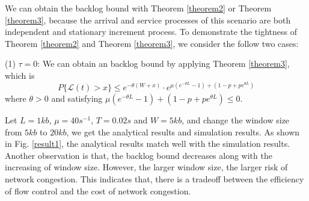 \documentclass[paper]{ieice}
\begin{document}

We can obtain the backlog bound with Theorem \ref{theorem2} or Theorem \ref{theorem3}, because the arrival and service processes of this scenario are both independent and stationary increment process. To demonstrate the tightness of Theorem \ref{theorem2} and Theorem \ref{theorem3}, we consider the follow two cases:

(1) $\tau=0$: We can obtain an backlog bound by applying Theorem \ref{theorem3}, which is
\begin{equation*}\label{equation3}
P\{\mathcal{L}(t)>x\}\leq e^{-\theta(W+x)}\cdot e^{\mu(e^{-\theta L}-1)+(1-p+pe^{\theta L})}
\end{equation*}
where $\theta>0$ and satisfying $\mu(e^{-\theta L}-1)+(1-p+pe^{\theta L})\leq 0$.

Let $L=1kb$, $\mu=40s^{-1}$, $T=0.02s$ and $W=5kb$, and change the window size from $5kb$ to $20kb$, we get the analytical results and simulation results. As shown in Fig. \ref{result1}, the analytical results match well with the simulation results. Another observation is that, the backlog bound decreases along with the increasing of window size. However, the larger window size, the larger risk of network congestion. This indicates that, there is a tradeoff between the efficiency of flow control and the cost of network congestion.
\end{document}
